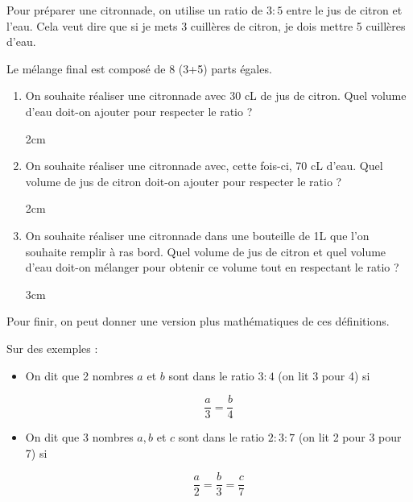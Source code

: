 \documentclass[a4paper]{book}
\begin{document}
    \begin{exemple}
        Pour préparer une citronnade, on utilise un ratio de $3:5$ entre le jus de citron et l'eau. Cela veut dire que si je mets 3 cuillères de citron, je dois mettre 5 cuillères d'eau.

        \medskip
        
        Le mélange final est composé de 8 (3+5) parts égales.

        \begin{enumerate}[leftmargin=*]
            \item On souhaite réaliser une citronnade avec 30 cL de jus de citron. Quel volume d'eau doit-on ajouter pour respecter le ratio ?

            \begin{ZoneReponse}{2cm}
            \end{ZoneReponse}

            \item On souhaite réaliser une citronnade avec, cette fois-ci, 70 cL d'eau. Quel volume de jus de citron doit-on ajouter pour respecter le ratio ?

            \begin{ZoneReponse}{2cm}
            \end{ZoneReponse}

            \item On souhaite réaliser une citronnade dans une bouteille de 1L que l'on souhaite remplir à ras bord. 
            Quel volume de jus de citron et quel volume d'eau doit-on mélanger pour obtenir ce volume tout en respectant le ratio ?

            \begin{ZoneReponse}{3cm}
            \end{ZoneReponse}
        \end{enumerate}
    \end{exemple}  


\newpage

    
    Pour finir, on peut donner une version plus mathématiques de ces définitions.
    \begin{definition}
        Sur des exemples :
        
        \begin{itemize}
            \item On dit que 2 nombres $a$ et $b$ sont dans le ratio $3:4$ (on lit 3 pour 4) si

            \[\dfrac{a}{3}=\dfrac{b}{4}\]

            \item On dit que 3 nombres $a, b$ et $c$ sont dans le ratio $2:3:7$ (on lit 2 pour 3 pour 7) si 

            \[\dfrac{a}{2}=\dfrac{b}{3}=\dfrac{c}{7}\]
        \end{itemize}
    \end{definition}
\end{document}
